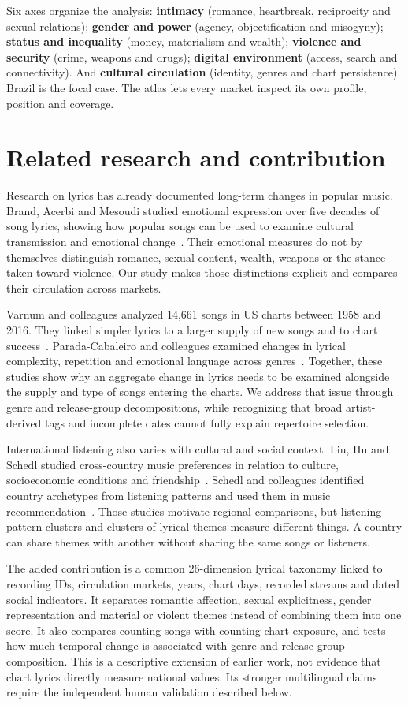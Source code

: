 \documentclass[10pt,a4paper,twocolumn]{article}
\begin{document}
Six axes organize the analysis: \textbf{intimacy} (romance, heartbreak, reciprocity and sexual relations); \textbf{gender and power} (agency, objectification and misogyny); \textbf{status and inequality} (money, materialism and wealth); \textbf{violence and security} (crime, weapons and drugs); \textbf{digital environment} (access, search and connectivity). And \textbf{cultural circulation} (identity, genres and chart persistence). Brazil is the focal case. The atlas lets every market inspect its own profile, position and coverage.

\section{Related research and contribution}
Research on lyrics has already documented long-term changes in popular music. Brand, Acerbi and Mesoudi studied emotional expression over five decades of song lyrics, showing how popular songs can be used to examine cultural transmission and emotional change~\cite{brand}. Their emotional measures do not by themselves distinguish romance, sexual content, wealth, weapons or the stance taken toward violence. Our study makes those distinctions explicit and compares their circulation across markets.

Varnum and colleagues analyzed 14,661 songs in US charts between 1958 and 2016. They linked simpler lyrics to a larger supply of new songs and to chart success~\cite{varnum}. Parada-Cabaleiro and colleagues examined changes in lyrical complexity, repetition and emotional language across genres~\cite{parada}. Together, these studies show why an aggregate change in lyrics needs to be examined alongside the supply and type of songs entering the charts. We address that issue through genre and release-group decompositions, while recognizing that broad artist-derived tags and incomplete dates cannot fully explain repertoire selection.

International listening also varies with cultural and social context. Liu, Hu and Schedl studied cross-country music preferences in relation to culture, socioeconomic conditions and friendship~\cite{liu}. Schedl and colleagues identified country archetypes from listening patterns and used them in music recommendation~\cite{schedl}. Those studies motivate regional comparisons, but listening-pattern clusters and clusters of lyrical themes measure different things. A country can share themes with another without sharing the same songs or listeners.

The added contribution is a common 26-dimension lyrical taxonomy linked to recording IDs, circulation markets, years, chart days, recorded streams and dated social indicators. It separates romantic affection, sexual explicitness, gender representation and material or violent themes instead of combining them into one score. It also compares counting songs with counting chart exposure, and tests how much temporal change is associated with genre and release-group composition. This is a descriptive extension of earlier work, not evidence that chart lyrics directly measure national values. Its stronger multilingual claims require the independent human validation described below.
\end{document}
